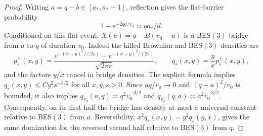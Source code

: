 \documentclass[11pt,letterpaper,reqno]{amsart}
\numberwithin{equation}{section}
\theoremstyle{remark}
\begin{document}
\begin{proof}
Writing $a=q-b\in[a_*,a_*+1]$, reflection gives the flat-barrier probability
\begin{equation}\label{eq:7.14}
1-e^{-2qa/v_0}\asymp qa_*/d.
\end{equation}
Conditioned on this flat event, $X(u)=q-B(v_0-u)$ is a BES$(3)$ bridge from $a$ to $q$ of duration $v_0$. Indeed the killed Brownian and BES$(3)$ densities are
\begin{equation}\label{eq:7.15}
p_s^+(x,y)=\frac{e^{-(x-y)^2/(2s)}-e^{-(x+y)^2/(2s)}}{\sqrt{2\pi s}},
\qquad q_s(x,y)=\frac yx p_s^+(x,y),
\end{equation}
and the factors $y/x$ cancel in bridge densities.
The explicit formula implies $q_s(x,y)\le Cy^2s^{-3/2}$ for all $x,y,s>0$.
Since $aq/v_0\to0$ and $(q-a)^2/v_0$ is bounded, it also implies
$q_{v_0}(a,q)\asymp q^2v_0^{-3/2}$ and
$q_{v_0}(q,a)\asymp a^2v_0^{-3/2}$.
Consequently, on its first half the bridge has density at most a universal constant relative to BES$(3)$ from $a$. Reversibility,
$x^2q_s(x,y)=y^2q_s(y,x)$, gives the same domination for the reversed second half relative to BES$(3)$ from $q$.


\end{proof}
\end{document}
